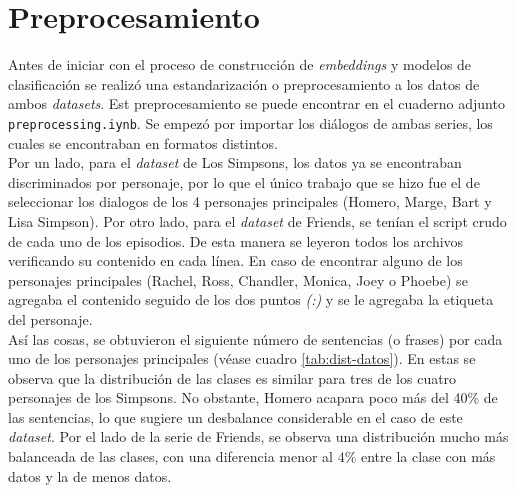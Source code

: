 \section{Preprocesamiento}

Antes de iniciar con el proceso de construcción de \textit{embeddings} y modelos de clasificación se realizó una estandarización o preprocesamiento a los datos de ambos \textit{datasets}. Est preprocesamiento se puede encontrar en el cuaderno adjunto  \texttt{preprocessing.iynb}. Se empezó por importar los diálogos de ambas series, los cuales se encontraban en formatos distintos. \\

Por un lado, para el \textit{dataset} de Los Simpsons, los datos ya se encontraban discriminados por personaje, por lo que el único trabajo que se hizo fue el de seleccionar los dialogos de los 4 personajes principales (Homero, Marge, Bart y Lisa Simpson). Por otro lado, para el \textit{dataset} de Friends, se tenían el script crudo de cada uno de los episodios. De esta manera se leyeron todos los archivos verificando su contenido en cada línea. En caso de encontrar alguno de los personajes principales (Rachel, Ross, Chandler, Monica, Joey o Phoebe) se agregaba el contenido seguido de los dos puntos \textit{(:)} y se le agregaba la etiqueta del personaje. \\

Así las cosas, se obtuvieron el siguiente número de sentencias (o frases) por cada uno de los personajes principales (véase cuadro \ref{tab:dist-datos}). En estas se observa que la distribución de las clases es similar para tres de los cuatro personajes de los Simpsons. No obstante, Homero acapara poco más del 40\% de las sentencias, lo que sugiere un desbalance considerable en el caso de este \textit{dataset}. Por el lado de la serie de Friends, se observa una distribución mucho más balanceada de las clases, con una diferencia menor al $4\%$ entre la clase con más datos y la de menos datos.

